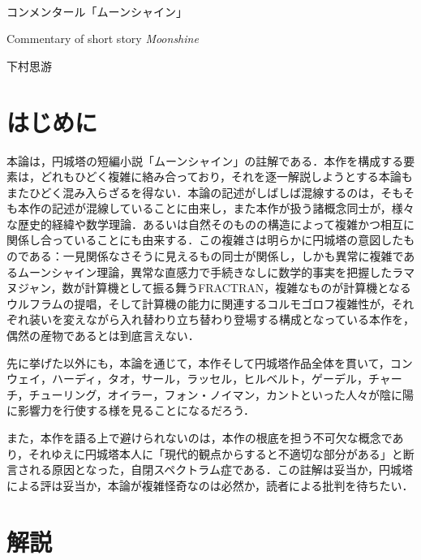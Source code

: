 \documentclass[10pt, a5paper, twoside]{jsarticle}
\theoremstyle{definition}
\begin{document}
	~ %

	\begin{center}

		\Large{コンメンタール「ムーンシャイン」}

		\vspace{3mm}

		\large{Commentary of short story \textit{Moonshine}}

		\vspace{3mm}
		
		\large{下村思游}

	\end{center}

	\vspace{3mm}

	\section{はじめに}

		本論は，円城塔の短編小説「ムーンシャイン」の註解である．本作を構成する要素は，どれもひどく複雑に絡み合っており，それを逐一解説しようとする本論もまたひどく混み入らざるを得ない．本論の記述がしばしば混線するのは，そもそも本作の記述が混線していることに由来し，また本作が扱う諸概念同士が，様々な歴史的経緯や数学理論．あるいは自然そのものの構造によって複雑かつ相互に関係し合っていることにも由来する．この複雑さは明らかに円城塔の意図したものである：一見関係なさそうに見えるもの同士が関係し，しかも異常に複雑であるムーンシャイン理論，異常な直感力で手続きなしに数学的事実を把握したラマヌジャン，数が計算機として振る舞うFRACTRAN，複雑なものが計算機となるウルフラムの提唱，そして計算機の能力に関連するコルモゴロフ複雑性が，それぞれ装いを変えながら入れ替わり立ち替わり登場する構成となっている本作を，偶然の産物であるとは到底言えない．

		先に挙げた以外にも，本論を通じて，本作そして円城塔作品全体を貫いて，コンウェイ，ハーディ，タオ，サール，ラッセル，ヒルベルト，ゲーデル，チャーチ，チューリング，オイラー，フォン・ノイマン，カントといった人々が陰に陽に影響力を行使する様を見ることになるだろう．

		また，本作を語る上で避けられないのは，本作の根底を担う不可欠な概念であり，それゆえに円城塔本人に「現代的観点からすると不適切な部分がある」と断言される原因となった，自閉スペクトラム症である．この註解は妥当か，円城塔による評は妥当か，本論が複雑怪奇なのは必然か，読者による批判を待ちたい．

	\section{解説}
\end{document}
